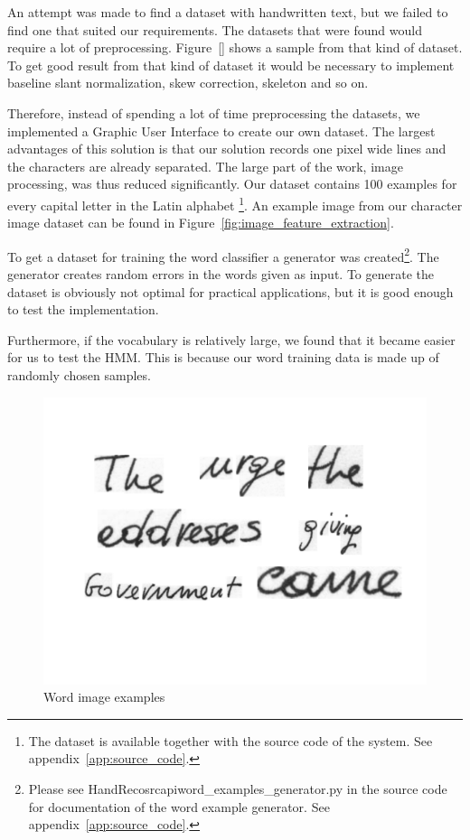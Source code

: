 
An attempt was made to find a dataset with handwritten text, but we failed to find one that suited our requirements.
The datasets that were found would require a lot of preprocessing. 
Figure~\ref{} shows a sample from that kind of dataset.
To get good result from that kind of dataset it would be necessary to implement baseline slant normalization, skew correction, skeleton and so on.

Therefore, instead of spending a lot of time preprocessing the datasets, we implemented a Graphic User Interface to create our own dataset.
The largest advantages of this solution is that our solution records one pixel wide lines and the characters are already separated. 
The large part of the work, image processing, was thus reduced significantly.
Our dataset contains 100 examples for every capital letter in the Latin alphabet
\footnote{The dataset is available together with the source code of the system. See appendix~\ref{app:source_code}.}.
An example image from our character image dataset can be found in Figure~\ref{fig:image_feature_extraction}.

To get a dataset for training the word classifier a generator was created\footnote{Please see HandReco\/src\/api\/word\_examples\_generator.py in the source code for documentation of the word example generator. See appendix~\ref{app:source_code}.}.
The generator creates random errors in the words given as input.
To generate the dataset is obviously not optimal for practical applications, but it is good enough to test the implementation.


Furthermore, if the vocabulary is relatively large, we found that it became easier for us to test the HMM.
This is because our word training data is made up of randomly chosen samples.

\begin{figure}[h!]
  \centering
  \includegraphics[width=5in]{datasets_examples}
  \caption{Word image examples}
  \label{figure:wordsexamples}
\end{figure}
